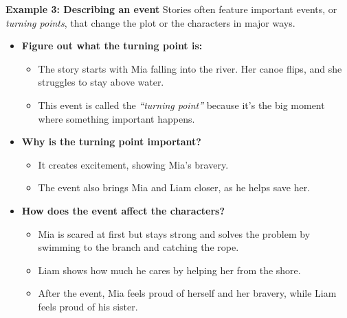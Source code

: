 \documentclass[12pt]{article}
\begin{document}
\begin{tcolorbox}[colframe=black!60, colback=white, 
coltitle=black, colbacktitle=black!15, fonttitle=\bfseries\Large, 
title=Examples, halign title=center, left=10pt, right=10pt, top=10pt, bottom=15pt]

\textbf{Example 3: Describing an event}
Stories often feature important events, or \textit{turning points}, that change the plot or the characters in major ways. 
\begin{itemize}
    \item \textbf{Figure out what the turning point is:}
\begin{itemize}
    \item The story starts with Mia falling into the river. Her canoe flips, and she struggles to stay above water.
    \item This event is called the \textit{“turning point”} because it’s the big moment where something important happens.
\end{itemize}
 \item \textbf{Why is the turning point important?}
    \begin{itemize}
        \item It creates excitement, showing Mia’s bravery.
    \end{itemize}
    \begin{itemize}
        \item The event also brings Mia and Liam closer, as he helps save her.
    \end{itemize}
 \item \textbf{How does the event affect the characters?}
    \begin{itemize}
        \item Mia is scared at first but stays strong and solves the problem by swimming to the branch and catching the rope.
    \end{itemize}
    \begin{itemize}
        \item Liam shows how much he cares by helping her from the shore.
    \end{itemize}
    \begin{itemize}
        \item After the event, Mia feels proud of herself and her bravery, while Liam feels proud of his sister.
    \end{itemize}
 \end{itemize}

 

 



 





 





     \end{tcolorbox}
\end{document}
